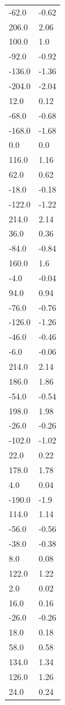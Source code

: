 \begin{longtable}{ll}
-62.0 & -0.62 \\
206.0 & 2.06 \\
100.0 & 1.0 \\
-92.0 & -0.92 \\
-136.0 & -1.36 \\
-204.0 & -2.04 \\
12.0 & 0.12 \\
-68.0 & -0.68 \\
-168.0 & -1.68 \\
0.0 & 0.0 \\
116.0 & 1.16 \\
62.0 & 0.62 \\
-18.0 & -0.18 \\
-122.0 & -1.22 \\
214.0 & 2.14 \\
36.0 & 0.36 \\
-84.0 & -0.84 \\
160.0 & 1.6 \\
-4.0 & -0.04 \\
94.0 & 0.94 \\
-76.0 & -0.76 \\
-126.0 & -1.26 \\
-46.0 & -0.46 \\
-6.0 & -0.06 \\
214.0 & 2.14 \\
186.0 & 1.86 \\
-54.0 & -0.54 \\
198.0 & 1.98 \\
-26.0 & -0.26 \\
-102.0 & -1.02 \\
22.0 & 0.22 \\
178.0 & 1.78 \\
4.0 & 0.04 \\
-190.0 & -1.9 \\
114.0 & 1.14 \\
-56.0 & -0.56 \\
-38.0 & -0.38 \\
8.0 & 0.08 \\
122.0 & 1.22 \\
2.0 & 0.02 \\
16.0 & 0.16 \\
-26.0 & -0.26 \\
18.0 & 0.18 \\
58.0 & 0.58 \\
134.0 & 1.34 \\
126.0 & 1.26 \\
24.0 & 0.24 \\

\end{longtable}
